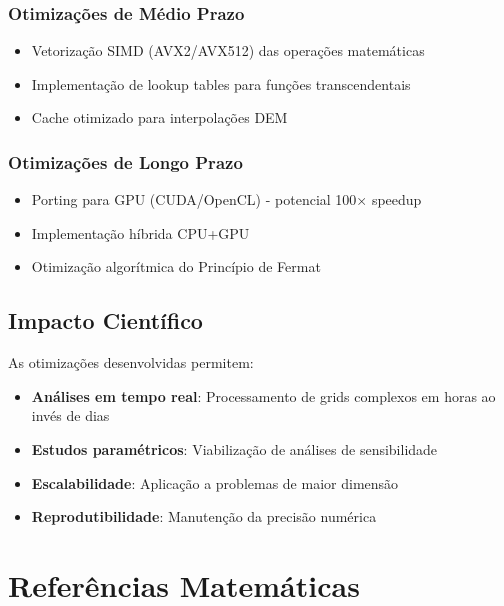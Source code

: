 \documentclass[12pt,a4paper]{article}
\begin{document}
\subsubsection{Otimizações de Médio Prazo}
\begin{itemize}
    \item Vetorização SIMD (AVX2/AVX512) das operações matemáticas
    \item Implementação de lookup tables para funções transcendentais
    \item Cache otimizado para interpolações DEM
\end{itemize}

\subsubsection{Otimizações de Longo Prazo}
\begin{itemize}
    \item Porting para GPU (CUDA/OpenCL) - potencial 100× speedup
    \item Implementação híbrida CPU+GPU
    \item Otimização algorítmica do Princípio de Fermat
\end{itemize}

\subsection{Impacto Científico}

As otimizações desenvolvidas permitem:
\begin{itemize}
    \item \textbf{Análises em tempo real}: Processamento de grids complexos em horas ao invés de dias
    \item \textbf{Estudos paramétricos}: Viabilização de análises de sensibilidade
    \item \textbf{Escalabilidade}: Aplicação a problemas de maior dimensão
    \item \textbf{Reprodutibilidade}: Manutenção da precisão numérica
\end{itemize}

\section{Referências Matemáticas}
\end{document}
